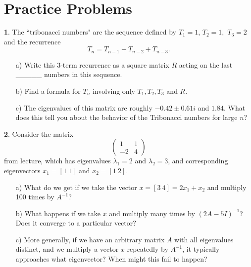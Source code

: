 \documentclass{article}
\theoremstyle{definition}
\newtheorem{prob}{}
\begin{document}
\section*{Practice Problems}

\begin{prob}
	The ``tribonacci numbers" are the sequence defined by $T_1=1$, $T_2=1,$ $T_3=2$ and the recurrence
	\[T_n=T_{n-1}+ T_{n-2}+ T_{n-3}.\]
	\begin{itemize}
		\item[a)] Write this 3-term recurrence as a square matrix $R$ acting on the last \_\_\_\_\_ numbers in this sequence. 
		\item[b)] Find a formula for $T_n$ involving only $T_1, T_2, T_3$ and $R$.
		\item[c)] The eigenvalues of this matrix are roughly $-0.42 \pm 0.61 i$ and $1.84$. What does this tell you about the behavior of the Tribonacci numbers for large $n$?
	\end{itemize}

\end{prob}



\begin{prob}
	Consider the matrix 
	\[\begin{pmatrix}
		1 & 1\\ -2 & 4
	\end{pmatrix}\]
from lecture, which has eigenvalues $\lambda_1=2$ and $\lambda_2=3$, and corresponding eigenvectors $x_1=[1 \ 1]$ and $x_2=[1\ 2]$.
\begin{itemize}
	\item[a)] What do we get if we take the vector $x= [3 \ 4]= 2x_1 + x_2$ and multiply 100 times by $A^{-1}$?
	\item[b)] What happens if we take $x$ and multiply many times by $(2A-5I)^{-1}$? Does it converge to a particular vector?
	\item[c)] More generally, if we have an arbitrary matrix $A$ with all eigenvalues distinct, and we multiply a vector $x$ repeatedly by $A^{-1}$, it typically approaches what eigenvector? When might this fail to happen?
\end{itemize}
\end{prob}
\end{document}
